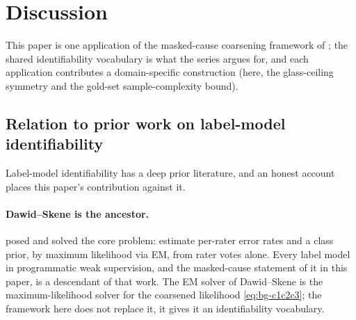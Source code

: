 \section{Discussion}
\label{sec:discussion}

This paper is one application of the masked-cause coarsening
framework of \citet{towell2026masked}; the shared identifiability
vocabulary is what the series argues for, and each application
contributes a domain-specific construction (here, the glass-ceiling
symmetry and the gold-set sample-complexity bound).

\subsection{Relation to prior work on label-model identifiability}

Label-model identifiability has a deep prior literature, and an
honest account places this paper's contribution against it.

\paragraph{Dawid--Skene is the ancestor.} \citet{dawid1979maximum}
posed and solved the core problem: estimate per-rater error rates and
a class prior, by maximum likelihood via EM, from rater votes alone.
Every label model in programmatic weak supervision, and the
masked-cause statement of it in this paper, is a descendant of that
work. The EM solver of Dawid--Skene is the maximum-likelihood solver
for the coarsened likelihood \eqref{eq:bg-c1c2c3}; the framework here
does not replace it, it gives it an identifiability vocabulary.

